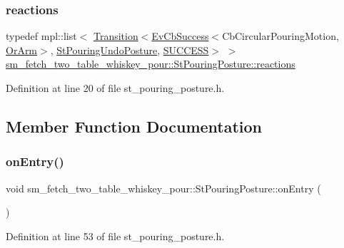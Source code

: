 \subsubsection{\texorpdfstring{reactions}{reactions}}
{\footnotesize\ttfamily typedef mpl\+::list$<$ \hyperlink{classsmacc_1_1Transition}{Transition}$<$\hyperlink{structsmacc_1_1EvCbSuccess}{Ev\+Cb\+Success}$<$Cb\+Circular\+Pouring\+Motion, \hyperlink{classsm__fetch__two__table__whiskey__pour_1_1OrArm}{Or\+Arm}$>$, \hyperlink{structsm__fetch__two__table__whiskey__pour_1_1StPouringUndoPosture}{St\+Pouring\+Undo\+Posture}, \hyperlink{structsmacc_1_1default__transition__tags_1_1SUCCESS}{S\+U\+C\+C\+E\+SS}$>$ $>$ \hyperlink{structsm__fetch__two__table__whiskey__pour_1_1StPouringPosture_a4cbcbdb61da0bd59a509340474670148}{sm\+\_\+fetch\+\_\+two\+\_\+table\+\_\+whiskey\+\_\+pour\+::\+St\+Pouring\+Posture\+::reactions}}



Definition at line 20 of file st\+\_\+pouring\+\_\+posture.\+h.



\subsection{Member Function Documentation}
\mbox{\label{structsm__fetch__two__table__whiskey__pour_1_1StPouringPosture_a41cc0c484ab7fcd27e95a27d729dd303}} 
\subsubsection{\texorpdfstring{on\+Entry()}{onEntry()}}
{\footnotesize\ttfamily void sm\+\_\+fetch\+\_\+two\+\_\+table\+\_\+whiskey\+\_\+pour\+::\+St\+Pouring\+Posture\+::on\+Entry (\begin{DoxyParamCaption}{ }\end{DoxyParamCaption})\hspace{0.3cm}{\ttfamily [inline]}}



Definition at line 53 of file st\+\_\+pouring\+\_\+posture.\+h.


